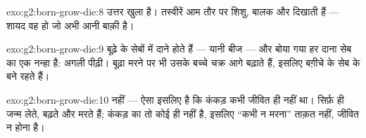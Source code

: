 \begin{solution}{exo:g2:born-grow-die:8}
उत्तर खुला है। तस्वीरें आम तौर पर शिशु, बालक और  दिखाती हैं ---
 शायद वह  हो जो अभी आनी बाक़ी है।
\end{solution}

\begin{solution}{exo:g2:born-grow-die:9}
बूढ़े  के सेबों में दाने होते हैं --- यानी बीज --- और बोया गया हर
दाना सेब का एक नन्हा  है: अगली पीढ़ी। बूढ़ा  मरने पर भी उसके
बच्चे चक्र आगे बढ़ाते हैं, इसलिए बग़ीचे के सेब के  बने रहते हैं।
\end{solution}

\begin{solution}{exo:g2:born-grow-die:10}
नहीं --- ऐसा इसलिए है कि कंकड़ कभी जीवित ही नहीं था। सिर्फ़  ही
जन्म लेते, बढ़ते और मरते हैं; कंकड़ का तो कोई  ही नहीं है,
इसलिए ``कभी न मरना'' ताक़त नहीं, जीवित न होना है।
\end{solution}
